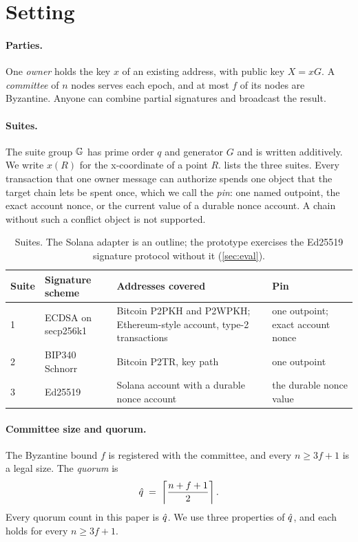 \section{Setting}\label{sec:setting}

\paragraph{Parties.} One \emph{owner} holds the key $x$ of an existing address, with public key $X = xG$. A \emph{committee} of $n$ nodes serves each epoch, and at most $f$ of its nodes are Byzantine. Anyone can combine partial signatures and broadcast the result.

\paragraph{Suites.} The suite group $\mathbb{G}$ has prime order $q$ and generator $G$ and is written additively. We write $x(R)$ for the x-coordinate of a point $R$.  lists the three suites. Every transaction that one owner message can authorize spends one object that the target chain lets be spent once, which we call the \emph{pin}: one named outpoint, the exact account nonce, or the current value of a durable nonce account. A chain without such a conflict object is not supported.

\begin{table}[t]
\centering
\small
\begin{tabularx}{\linewidth}{@{}ll>{\raggedright\arraybackslash}X>{\raggedright\arraybackslash}p{3.6cm}@{}}
\toprule
Suite & Signature scheme & Addresses covered & Pin \\
\midrule
1 & ECDSA on secp256k1 & Bitcoin P2PKH and P2WPKH; Ethereum-style account, type-2 transactions & one outpoint; exact account nonce \\
2 & BIP340 Schnorr & Bitcoin P2TR, key path & one outpoint \\
3 & Ed25519 & Solana account with a durable nonce account & the durable nonce value \\
\bottomrule
\end{tabularx}
\caption{Suites. The Solana adapter is an outline; the prototype exercises the Ed25519 signature protocol without it (\cref{sec:eval}).}
\label{tab:suites}
\end{table}

\paragraph{Committee size and quorum.} The Byzantine bound $f$ is registered with the committee, and every $n \ge 3f+1$ is a legal size. The \emph{quorum} is
\[
  \hat{q} \;=\; \left\lceil \frac{n+f+1}{2} \right\rceil .
\]
Every quorum count in this paper is $\hat{q}$. We use three properties of $\hat{q}$, and each holds for every $n \ge 3f+1$.

